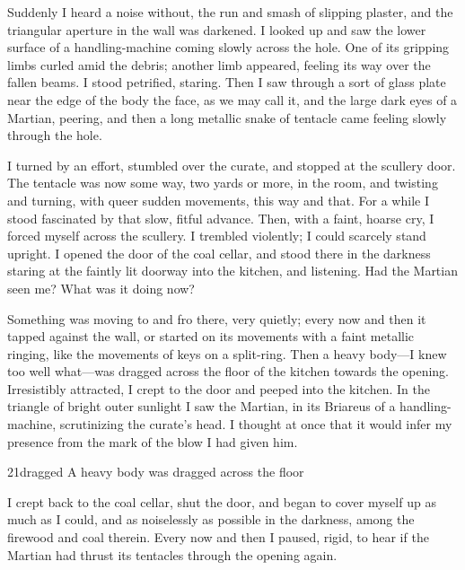 Suddenly I heard a noise without, the run and smash of slipping plaster, and the triangular aperture in the wall was darkened. I looked up and saw the lower surface of a handling-machine coming slowly across the hole. One of its gripping limbs curled amid the debris; another limb appeared, feeling its way over the fallen beams. I stood petrified, staring. Then I saw through a sort of glass plate near the edge of the body the face, as we may call it, and the large dark eyes of a Martian, peering, and then a long metallic snake of tentacle came feeling slowly through the hole.

I turned by an effort, stumbled over the curate, and stopped at the scullery door. The tentacle was now some way, two yards or more, in the room, and twisting and turning, with queer sudden movements, this way and that. For a while I stood fascinated by that slow, fitful advance. Then, with a faint, hoarse cry, I forced myself across the scullery. I trembled violently; I could scarcely stand upright. I opened the door of the coal cellar, and stood there in the darkness staring at the faintly lit doorway into the kitchen, and listening. Had the Martian seen me? What was it doing now?

Something was moving to and fro there, very quietly; every now and then it tapped against the wall, or started on its movements with a faint metallic ringing, like the movements of keys on a split-ring. Then a heavy body—I knew too well what—was dragged across the floor of the kitchen towards the opening. Irresistibly attracted, I crept to the door and peeped into the kitchen. In the triangle of bright outer sunlight I saw the Martian, in its Briareus of a handling-machine, scrutinizing the curate's head. I thought at once that it would infer my presence from the mark of the blow I had given him.


\begin{bwbigpic}
	[1.2] 
	{21dragged} 
	{A heavy body was dragged across the floor}
\end{bwbigpic}

I crept back to the coal cellar, shut the door, and began to cover myself up as much as I could, and as noiselessly as possible in the darkness, among the firewood and coal therein. Every now and then I paused, rigid, to hear if the Martian had thrust its tentacles through the opening again.

